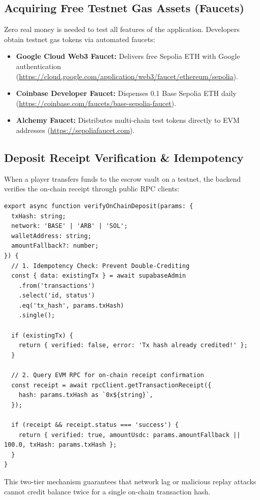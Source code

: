 \subsection{Acquiring Free Testnet Gas Assets (Faucets)}
Zero real money is needed to test all features of the application. Developers obtain testnet gas tokens via automated faucets:
\begin{itemize}[leftmargin=1.5em]
    \item \textbf{Google Cloud Web3 Faucet:} Delivers free Sepolia ETH with Google authentication (\url{https://cloud.google.com/application/web3/faucet/ethereum/sepolia}).
    \item \textbf{Coinbase Developer Faucet:} Dispenses 0.1 Base Sepolia ETH daily (\url{https://coinbase.com/faucets/base-sepolia-faucet}).
    \item \textbf{Alchemy Faucet:} Distributes multi-chain test tokens directly to EVM addresses (\url{https://sepoliafaucet.com}).
\end{itemize}

\subsection{Deposit Receipt Verification \& Idempotency}
When a player transfers funds to the escrow vault on a testnet, the backend verifies the on-chain receipt through public RPC clients:

\begin{lstlisting}[language=Solidity,caption={Deposit Receipt Verification in lib/web3/deposit-listener.ts}]
export async function verifyOnChainDeposit(params: {
  txHash: string;
  network: 'BASE' | 'ARB' | 'SOL';
  walletAddress: string;
  amountFallback?: number;
}) {
  // 1. Idempotency Check: Prevent Double-Crediting
  const { data: existingTx } = await supabaseAdmin
    .from('transactions')
    .select('id, status')
    .eq('tx_hash', params.txHash)
    .single();

  if (existingTx) {
    return { verified: false, error: 'Tx hash already credited!' };
  }

  // 2. Query EVM RPC for on-chain receipt confirmation
  const receipt = await rpcClient.getTransactionReceipt({
    hash: params.txHash as `0x${string}`,
  });

  if (receipt && receipt.status === 'success') {
    return { verified: true, amountUsdc: params.amountFallback || 100.0, txHash: params.txHash };
  }
}
\end{lstlisting}

This two-tier mechanism guarantees that network lag or malicious replay attacks cannot credit balance twice for a single on-chain transaction hash.
